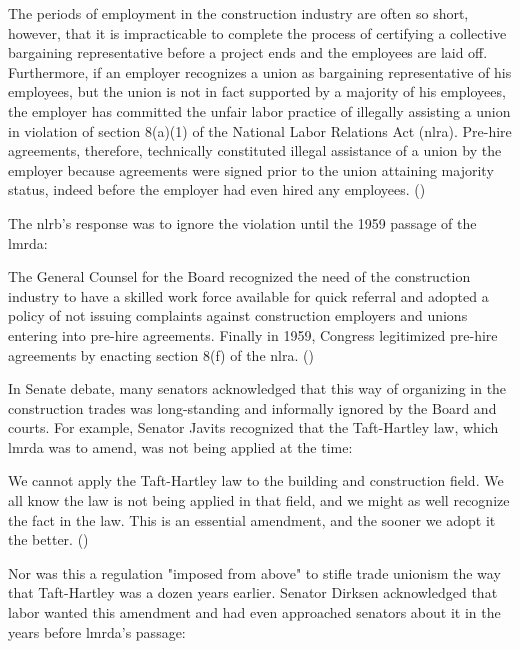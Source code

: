 \documentclass[12pt]{article}
\renewenvironment{quote}
  {\list{}{\leftmargin=\parindent\rightmargin=0pt}%
   \item\relax}
  {\endlist}
\begin{document}
\begin{quote}
The periods of employment in the construction industry are often so short, however, that it is impracticable to complete the process of certifying a collective bargaining representative before a project ends and the employees are laid off. Furthermore, if an employer recognizes a union as bargaining representative of his employees, but the union is not in fact supported by a majority of his employees, the employer has committed the unfair labor practice of illegally assisting a union in violation of section 8(a)(1) of the National Labor Relations Act (\acrshort{nlra}). Pre-hire agreements, therefore, technically constituted illegal assistance of a union by the employer because agreements were signed prior to the union attaining majority status, indeed before the employer had even hired any employees. (\citeyear[1016–17]{murphyPreHireAgreementsSection1982})
\end{quote}

The \acrshort{nlrb}’s response was to ignore the violation until the 1959 passage of the \acrshort{lmrda}:

\begin{quote}
The General Counsel for the Board recognized the need of the construction industry to have a skilled work force available for quick referral and adopted a policy of not issuing complaints against construction employers and unions entering into pre-hire agreements. Finally in 1959, Congress legitimized pre-hire agreements by enacting section 8(f) of the \acrshort{nlra}. (\cite[1017]{murphyPreHireAgreementsSection1982})
\end{quote}

In Senate debate, many senators acknowledged that this way of organizing in the construction trades was long-standing and informally ignored by the Board and courts. For example, Senator Javits recognized that the Taft-Hartley law, which \acrshort{lmrda} was to amend, was not being applied at the time:

\begin{quote}
We cannot apply the Taft-Hartley law to the building and construction field. We all know the law is not being applied in that field, and we might as well recognize the fact in the law. This is an essential amendment, and the sooner we adopt it the better. (\cite[6395]{105CongressionalRecord1959})
\end{quote}

Nor was this a regulation "imposed from above" to stifle trade unionism the way that Taft-Hartley was a dozen years earlier. Senator Dirksen acknowledged that labor wanted this amendment and had even approached senators about it in the years before \acrshort{lmrda}’s passage:
\end{document}
